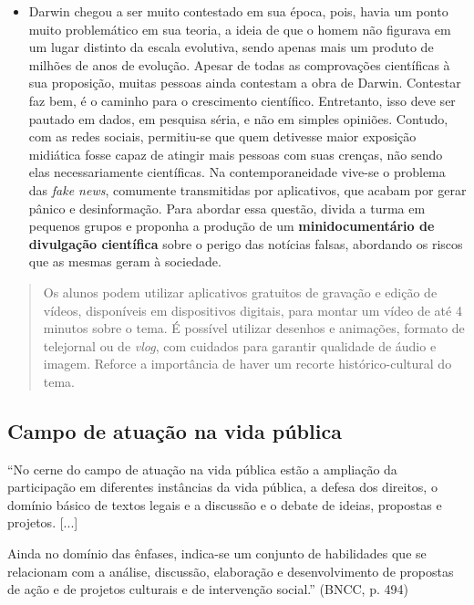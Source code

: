 \documentclass[12pt]{extarticle}
\begin{document}
\begin{itemize}
\item
  Darwin chegou a ser muito contestado em sua época, pois, havia um
  ponto muito problemático em sua teoria, a ideia de que o homem não
  figurava em um lugar distinto da escala evolutiva, sendo apenas mais
  um produto de milhões de anos de evolução. Apesar de todas as
  comprovações científicas à sua proposição, muitas pessoas ainda
  contestam a obra de Darwin. Contestar faz bem, é o caminho para o
  crescimento científico. Entretanto, isso deve ser pautado em dados, em
  pesquisa séria, e não em simples opiniões. Contudo, com as redes
  sociais, permitiu-se que quem detivesse maior exposição midiática
  fosse capaz de atingir mais pessoas com suas crenças, não sendo elas
  necessariamente científicas. Na contemporaneidade vive-se o problema
  das \emph{fake news}, comumente transmitidas por aplicativos, que
  acabam por gerar pânico e desinformação. Para abordar essa questão,
  divida a turma em pequenos grupos e proponha a produção de um
  \textbf{minidocumentário de divulgação científica} sobre o perigo das
  notícias falsas, abordando os riscos que as mesmas geram à sociedade.
\end{itemize}

\begin{quote}
Os alunos podem utilizar aplicativos gratuitos de gravação e edição de
vídeos, disponíveis em dispositivos digitais, para montar um vídeo de
até 4 minutos sobre o tema. É possível utilizar desenhos e animações,
formato de telejornal ou de \emph{vlog}, com cuidados para garantir
qualidade de áudio e imagem. Reforce a importância de haver um recorte
histórico-cultural do tema.
\end{quote}

\subsection{Campo de atuação na vida pública}

``No cerne do campo de atuação na vida pública estão a ampliação da
participação em diferentes instâncias da vida pública, a defesa dos
direitos, o domínio básico de textos legais e a discussão e o debate de
ideias, propostas e projetos. {[}...{]}

Ainda no domínio das ênfases, indica-se um conjunto de habilidades que
se relacionam com a análise, discussão, elaboração e desenvolvimento de
propostas de ação e de projetos culturais e de intervenção social.''
(BNCC, p. 494)
\end{document}
